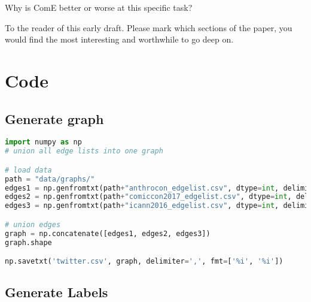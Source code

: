 \documentclass[sigconf]{acmart}
\begin{document}
Why is ComE better or worse at this specific task?






\begin{acks}
To the reader of this early draft. Please mark which sections of the paper, you would find the most interesting and worthwhile to go deep on.
\end{acks}


\appendix

\section{Code}

\subsection{Generate graph}

\begin{lstlisting}[language=python]
import numpy as np
# union all edge lists into one graph

# load data
path = "data/graphs/"
edges1 = np.genfromtxt(path+"anthrocon_edgelist.csv", dtype=int, delimiter=',')
edges2 = np.genfromtxt(path+"comiccon2017_edgelist.csv", dtype=int, delimiter=',')
edges3 = np.genfromtxt(path+"icann2016_edgelist.csv", dtype=int, delimiter=',')

# union edges
graph = np.concatenate([edges1, edges2, edges3])
graph.shape

np.savetxt('twitter.csv', graph, delimiter=',', fmt=['%i', '%i'])
\end{lstlisting}

\subsection{Generate Labels}
\end{document}
